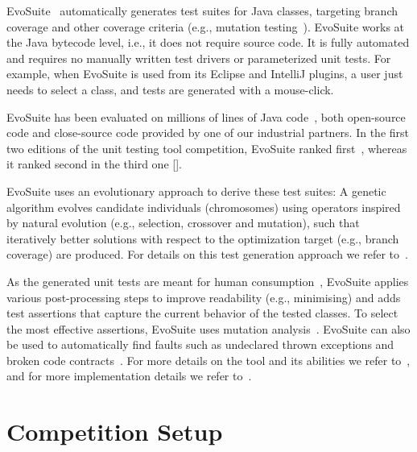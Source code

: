 \documentclass[10pt,conference,compsocconf]{IEEEtran}
\newcommand{\EVOSUITE}{{\sc EvoSuite}\xspace}
\begin{document}
\EVOSUITE~\cite{FrA11c,GoA_TSE12} automatically generates test suites
for Java classes, targeting branch coverage and other coverage
criteria (e.g., mutation testing~\cite{emse14_mutation}). \EVOSUITE
works at the Java bytecode level, i.e., it does not require source
code. It is fully automated and requires no manually written test
drivers or parameterized unit tests.  For example, when \EVOSUITE is
used from its Eclipse and IntelliJ plugins, a user
just needs to select a class, and tests are generated with a mouse-click.

\EVOSUITE has been evaluated on millions of lines of Java
code~\cite{fraser2014large}, both open-source code and close-source
code provided by one of our industrial partners.  In the first two
editions of the unit testing tool competition, \EVOSUITE ranked
first~\cite{evosuiteAtSbst2013,evosuiteAtFittest2013}, whereas it
ranked second in the third one [].


\EVOSUITE uses an evolutionary approach to derive these test suites: A
genetic algorithm evolves candidate individuals (chromosomes) using
operators inspired by natural evolution (e.g., selection, crossover
and mutation), such that iteratively better solutions with respect to
the optimization target (e.g., branch coverage) are produced.  For
details on this test generation approach we refer to~\cite{GoA_TSE12}.


As the generated unit tests are meant for human
consumption~\cite{fraser2013does}, \EVOSUITE applies various
post-processing steps to improve readability (e.g., minimising) and
adds test assertions that capture the current behavior of the tested
classes. To select the most effective assertions, \EVOSUITE uses
mutation analysis~\cite{10.1109/TSE.2011.93}.  \EVOSUITE can also be
used to automatically find faults such as undeclared thrown exceptions
and broken code contracts~\cite{emse13_oracle}.  For more details on
the tool and its abilities we refer to~\cite{FrA11c}, and for more
implementation details we refer to~\cite{FrA13a}.

\section{Competition Setup}
\end{document}
